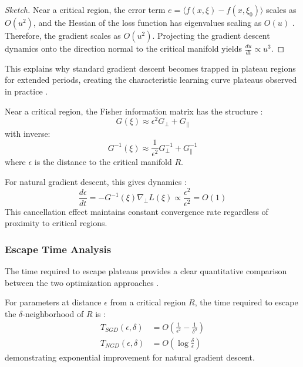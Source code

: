 \documentclass[a4paper]{article}
\begin{document}
\begin{proof}[Sketch]
Near a critical region, the error term $e = \langle f(x, \xi) - f(x, \xi_0) \rangle$ scales as $O(u^2)$, and the Hessian of the loss function has eigenvalues scaling as $O(u)$ \cite{wei2008dynamics}. Therefore, the gradient scales as $O(u^2)$. Projecting the gradient descent dynamics onto the direction normal to the critical manifold yields $\frac{du}{dt} \propto u^3$.
\end{proof}

This explains why standard gradient descent becomes trapped in plateau regions for extended periods, creating the characteristic learning curve plateaus observed in practice \cite{dauphin2014identifying, pascanu2014saddle}.

\begin{theorem}
Near a critical region, the Fisher information matrix has the structure \cite{amari1998natural, martens2015optimizing}:
\begin{equation}
G(\xi) \approx \epsilon^2 G_{\perp} + G_{\parallel}
\end{equation}
with inverse:
\begin{equation}
G^{-1}(\xi) \approx \frac{1}{\epsilon^2}G_{\perp}^{-1} + G_{\parallel}^{-1}
\end{equation}
where $\epsilon$ is the distance to the critical manifold $R$.

For natural gradient descent, this gives dynamics \cite{amari2016information}:
\begin{equation}
\frac{d\epsilon}{dt} = -G^{-1}(\xi)\nabla_{\perp} L(\xi) \propto \frac{\epsilon^2}{\epsilon^2} = O(1)
\end{equation}
This cancellation effect maintains constant convergence rate regardless of proximity to critical regions.
\end{theorem}

\subsubsection{Escape Time Analysis}

The time required to escape plateaus provides a clear quantitative comparison between the two optimization approaches \cite{dauphin2014identifying, martens2010deep}.

\begin{theorem}
For parameters at distance $\epsilon$ from a critical region $R$, the time required to escape the $\delta$-neighborhood of $R$ is \cite{amari2016information, wei2008dynamics}:
\begin{align}
T_{SGD}(\epsilon, \delta) &= O\left(\frac{1}{\epsilon^2} - \frac{1}{\delta^2}\right) \\
T_{NGD}(\epsilon, \delta) &= O\left(\log\frac{\delta}{\epsilon}\right)
\end{align}
demonstrating exponential improvement for natural gradient descent.
\end{theorem}
\end{document}

